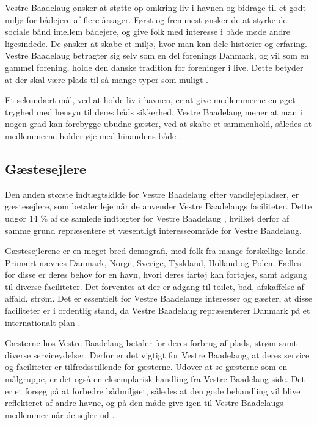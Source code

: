 Vestre Baadelaug ønsker at støtte op omkring liv i havnen og bidrage til et godt miljø for bådejere af flere årsager. Først og fremmest ønsker de at styrke de sociale bånd imellem bådejere, og give folk med interesse i både møde andre ligesindede. De ønsker at skabe et miljø, hvor man kan dele historier og erfaring. Vestre Baadelaug betragter sig selv som en del forenings Danmark, og vil som en gammel forening, holde den danske tradition for foreninger i live. Dette betyder at der skal være plads til så mange typer som muligt \cite{int_vb_sl}.

Et sekundært mål, ved at holde liv i havnen, er at give medlemmerne en øget tryghed med hensyn til deres båds sikkerhed. Vestre Baadelaug mener at man i nogen grad kan forebygge ubudne gæster, ved at skabe et sammenhold, således at medlemmerne holder øje med hinandens både \cite{int_vb_sl}.


\subsection{Gæstesejlere}

Den anden største indtægtskilde for Vestre Baadelaug efter vandlejepladser, er gæstesejlere, som betaler leje når de anvender Vestre Baadelaugs faciliteter. Dette udgør 14 \% af de samlede indtægter for Vestre Baadelaug \cite{vestre_arsregnskab}, hvilket derfor af samme grund repræsentere et væsentligt interesseområde for Vestre Baadelaug.

Gæstesejlerene er en meget bred demografi, med folk fra mange forskellige lande. Primært nævnes Danmark, Norge, Sverige, Tyskland, Holland og Polen. Fælles for disse er deres behov for en havn, hvori deres fartøj kan fortøjes, samt adgang til diverse faciliteter. Det forventes at der er adgang til toilet, bad, afskaffelse af affald, strøm. Det er essentielt for Vestre Baadelaugs interesser og gæster, at disse faciliteter er i ordentlig stand, da Vestre Baadelaug repræsenterer Danmark på et internationalt plan \cite{int_vb_sl}.

Gæsterne hos Vestre Baadelaug betaler for deres forbrug af plads, strøm samt diverse serviceydelser. Derfor er det vigtigt for Vestre Baadelaug, at deres service og faciliteter er tilfredsstillende for gæsterne. Udover at se gæsterne som en målgruppe, er det også en eksemplarisk handling fra Vestre Baadelaug side. Det er et forsøg på at forbedre bådmiljøet, således at den gode behandling vil blive reflekteret af andre havne, og på den måde give igen til Vestre Baadelaugs medlemmer når de sejler ud \cite{int_vb_sl}.

